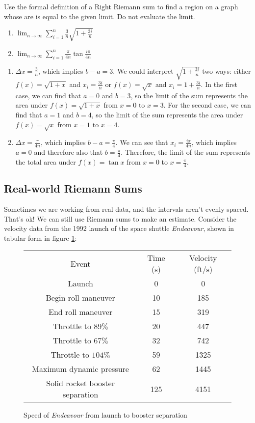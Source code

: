 \begin{Exercise}[label=limsum2]
Use the formal definition of a Right Riemann sum to find a region on a graph whose are is equal to the given limit. Do not evaluate the limit. 
\begin{enumerate}
\item $\lim_{n\to \infty} \sum_{i=1}^{n}\frac{3}{n}\sqrt{1+\frac{3i}{n}}$
\item $\lim_{n\to\infty} \sum_{i=1}^{n}\frac{\pi}{4n}\tan{\frac{i\pi}{4n}}$
\end{enumerate}
\end{Exercise}

\begin{Answer}[ref=limsum2]
\begin{enumerate}
\item $\Delta x = \frac{3}{n}$, which implies $b-a=3$. We could interpret $\sqrt{1+\frac{3i}{n}}$ two ways: either $f(x) = \sqrt{1+x}$ and $x_i = \frac{3i}{n}$ or $f(x) = \sqrt{x}$ and $x_i=1+\frac{3i}{n}$. In the first case, we can find that $a=0$ and $b=3$, so the limit of the sum represents the area under $f(x) = \sqrt{1+x}$ from $x=0$ to $x=3$. For the second case, we can find that $a=1$ and $b=4$, so the limit of the sum represents the area under $f(x) = \sqrt{x}$ from $x=1$ to $x=4$. 
\item $\Delta x = \frac{\pi}{4n}$, which implies $b-a=\frac{\pi}{4}$. We can see that $x_i = \frac{i\pi}{4n}$, which implies $a=0$ and therefore also that $b=\frac{\pi}{4}$. Therefore, the limit of the sum represents the total area under $f(x) = \tan{x}$ from $x=0$ to $x=\frac{\pi}{4}$. 
\end{enumerate}
\end{Answer}

\subsection{Real-world Riemann Sums}
Sometimes we are working from real data, and the intervals aren't evenly spaced. That's ok! We can still use Riemann sums to make an estimate. Consider the velocity data from the 1992 launch of the space shuttle \textit{Endeavour}, shown in tabular form in figure \ref{fig:endeavourdata}:

\begin{figure}
	\centering
	\begin{tabular}{c|c|c}
	Event & Time (s) & Velocity (ft/s) \\
	Launch & 0 & 0 \\
	Begin roll maneuver & 10 & 185 \\
	End roll maneuver & 15 & 319 \\
	Throttle to $89\%$ & 20 & 447 \\
	Throttle to $67\%$ & 32 & 742 \\
	Throttle to $104\%$ & 59 & 1325 \\
	Maximum dynamic pressure & 62 & 1445 \\
	Solid rocket booster separation & 125 & 4151 \\
	\end{tabular}
	\caption{Speed of \textit{Endeavour} from launch to booster separation}
	\label{fig:endeavourdata}
\end{figure}

